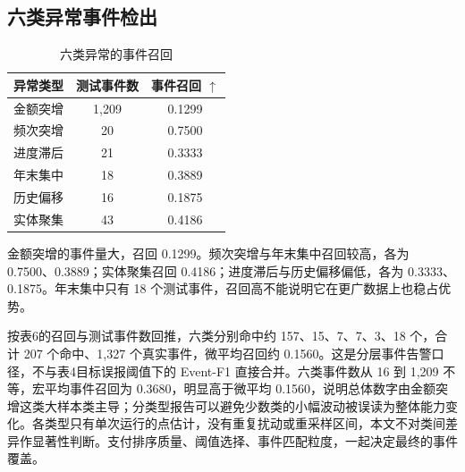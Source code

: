 \documentclass[a4paper,fleqn]{cas-dc}
\begin{document}
\subsection{六类异常事件检出}
\begin{table}[pos=tbp]
\scriptsize
\setlength{\tabcolsep}{3pt}
\caption{六类异常的事件召回}
\begin{tabular*}{\tblwidth}{@{\extracolsep{\fill}}lcc@{}}
\toprule
异常类型 & 测试事件数 & 事件召回 $\uparrow$ \\
\midrule
金额突增 & 1,209 & 0.1299 \\
频次突增 & 20 & 0.7500 \\
进度滞后 & 21 & 0.3333 \\
年末集中 & 18 & 0.3889 \\
历史偏移 & 16 & 0.1875 \\
实体聚集 & 43 & 0.4186 \\
\bottomrule
\end{tabular*}
\end{table}

金额突增的事件量大，召回 0.1299。频次突增与年末集中召回较高，各为 0.7500、0.3889；实体聚集召回 0.4186；进度滞后与历史偏移偏低，各为 0.3333、0.1875。年末集中只有 18 个测试事件，召回高不能说明它在更广数据上也稳占优势。

按表6的召回与测试事件数回推，六类分别命中约 157、15、7、7、3、18 个，合计 207 个命中、1,327 个真实事件，微平均召回约 0.1560。这是分层事件告警口径，不与表4目标误报阈值下的 Event-F1 直接合并。六类事件数从 16 到 1,209 不等，宏平均事件召回为 0.3680，明显高于微平均 0.1560，说明总体数字由金额突增这类大样本类主导；分类型报告可以避免少数类的小幅波动被误读为整体能力变化。各类型只有单次运行的点估计，没有重复扰动或重采样区间，本文不对类间差异作显著性判断。支付排序质量、阈值选择、事件匹配粒度，一起决定最终的事件覆盖。
\end{document}
